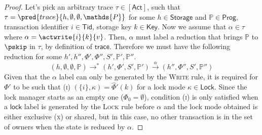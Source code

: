 \begin{proof}
Let's pick an arbitrary trace $\tau \in \mathsf{[Act]}$, such that $\tau = \pred{trace}{h, \emptyset, \emptyset, \mathds{P}}$ for some $h \in \mathsf{Storage}$ and $\mathds{P} \in \mathsf{Prog}$, transaction identifier $i \in \mathsf{Tid}$, storage key $k \in \mathsf{Key}$. Now we assume that  $\alpha \in \tau$ where $\alpha = \actwrite{i}{k}{v}$. Then, $\alpha$ must label a reduction that brings $\mathds{P}$ to $\pskip$ in $\tau$, by definition of $\mathsf{trace}$. Therefore we must have the following reduction for some $h', h'', \Phi', \Phi'', S', \mathds{P}', \mathds{P}''$.
\[
(h, \emptyset, \emptyset, \mathds{P}) \rightarrow^* (h', \Phi', S', \mathds{P}') \xrightarrow{\alpha} (h'', \Phi'', S', \mathds{P}'')
\]
Given that the $\alpha$ label can only be generated by the \textsc{Write} rule, it is required for $\Phi'$ to be such that (\textsc{i}) $(\{i\}, \kappa) = \hat{\Phi}'(k)$ for a lock mode $\kappa \in \mathsf{Lock}$. Since the lock manager starts as an empty one ($\Phi_0 = \emptyset$), condition (\textsc{i}) is only satisfied when a $\mathsf{lock}$ label is generated by the \textsc{Lock} rule before $\alpha$ and the lock mode obtained is either exclusive (\textsc{x}) or shared, but in this case, no other transaction is in the set of owners when the state is reduced by $\alpha$.


\end{proof}
